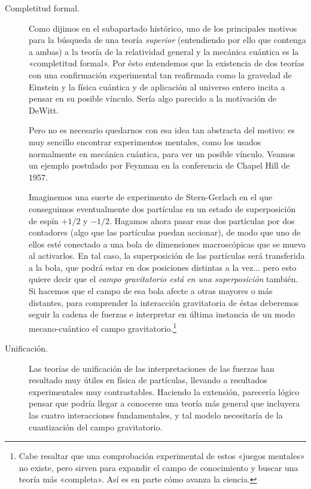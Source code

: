 \documentclass[11pt,a4paper,titlepage]{article}
\begin{document}
\begin{description}
  \item[Completitud formal.]{Como dijimos en el subapartado histórico, uno de los principales motivos para la búsqueda de una teoría \textit{superior} (entendiendo por ello que contenga a ambas) a la teoría de la relatividad general y la mecánica cuántica es la «completitud formal». Por ésto entendemos que la existencia de dos teorías con una confirmación experimental tan reafirmada como la gravedad de Einstein y la física cuántica y de aplicación al universo entero incita a pensar en su posible vínculo. Sería algo parecido a la motivación de DeWitt.

  Pero no es necesario quedarnos con esa idea tan abstracta del motivo: es muy sencillo encontrar experimentos mentales, como los usados normalmente en mecánica cuántica, para ver un posible vínculo. Veamos un ejemplo postulado por Feynman en la conferencia de Chapel Hill de 1957.

  Imaginemos una suerte de experimento de Stern-Gerlach en el que conseguimos eventualmente dos partículas en un estado de superposición de espín $+1/2$ y $-1/2$. Hagamos ahora pasar esas dos partículas por dos contadores (algo que las partículas puedan accionar), de modo que uno de ellos esté conectado a una bola de dimensiones macroscópicas que se mueva al activarlos. En tal caso, la superposición de las partículas será transferida a la bola, que podrá estar en dos posiciones distintas a la vez... pero esto quiere decir que el \textit{campo gravitatorio está en una superposición} también. Si hacemos que el campo de esa bola afecte a otras mayores o más distantes, para comprender la interacción gravitatoria de éstas deberemos seguir la cadena de fuerzas e interpretar en última instancia de un modo mecano-cuántico el campo gravitatorio.\footnote{Cabe resaltar que una comprobación experimental de estos «juegos mentales» no existe, pero sirven para expandir el campo de conocimiento y buscar una teoría más «completa». Así es en parte cómo avanza la ciencia.}}

  \item[Unificación.]{Las teorías de unificación de las interpretaciones de las fuerzas han resultado muy útiles en física de partículas, llevando a resultados experimentales muy contrastables. Haciendo la extensión, parecería lógico pensar que podría llegar a conocerse una teoría más general que incluyera las cuatro interacciones fundamentales, y tal modelo necesitaría de la cuantización del campo gravitatorio.}


\end{description}
\end{document}
